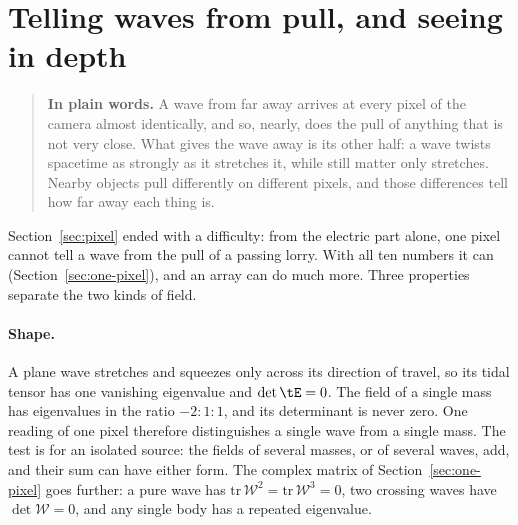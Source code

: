 \section{Telling waves from pull, and seeing in depth}\label{sec:separation}

\begin{quote}
\textbf{In plain words.} A wave from far away arrives at every pixel of the
camera almost identically, and so, nearly, does the pull of anything that is
not very close. What gives the wave away is its other half: a wave twists
spacetime as strongly as it stretches it, while still matter only stretches.
Nearby objects pull differently on different pixels, and those differences
tell how far away each thing is.
\end{quote}

Section~\ref{sec:pixel} ended with a difficulty: from the electric part alone,
one pixel cannot tell a wave from the pull of a passing lorry. With all ten
numbers it can (Section~\ref{sec:one-pixel}), and an array can do much more.
Three properties separate the two kinds of field.

\paragraph{Shape.} A plane wave stretches and squeezes only across its
direction of travel, so its tidal tensor has one vanishing eigenvalue and
$\det\tE = 0$. The field of a single mass has eigenvalues in the ratio
$-2 : 1 : 1$, and its determinant is never zero. One reading of one pixel
therefore distinguishes a single wave from a single mass. The test is for an
isolated source: the fields of several masses, or of several waves, add, and
their sum can have either form. The complex matrix of
Section~\ref{sec:one-pixel} goes further: a pure wave has
$\mathrm{tr}\,\mathcal{W}^2 = \mathrm{tr}\,\mathcal{W}^3 = 0$, two crossing waves have
$\det\mathcal{W} = 0$, and any single body has a repeated eigenvalue.


